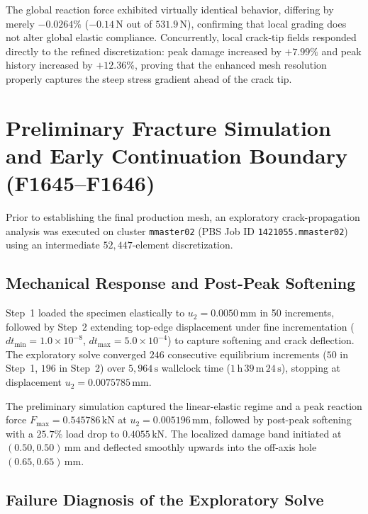 The global reaction force exhibited virtually identical behavior, differing by merely $-0.0264\%$ ($-0.14\,\mathrm{N}$ out of $531.9\,\mathrm{N}$), confirming that local grading does not alter global elastic compliance. Concurrently, local crack-tip fields responded directly to the refined discretization: peak damage increased by $+7.99\%$ and peak history increased by $+12.36\%$, proving that the enhanced mesh resolution properly captures the steep stress gradient ahead of the crack tip.

\section{Preliminary Fracture Simulation and Early Continuation Boundary (F1645--F1646)}
\label{sec:hole_preliminary_fracture}

Prior to establishing the final production mesh, an exploratory crack-propagation analysis was executed on cluster \texttt{mmaster02} (PBS Job ID \texttt{1421055.mmaster02}) using an intermediate $52{,}447$-element discretization. 

\subsection{Mechanical Response and Post-Peak Softening}
\label{subsec:hole_prelim_mechanical}

Step~1 loaded the specimen elastically to $u_2 = 0.0050\,\mathrm{mm}$ in 50 increments, followed by Step~2 extending top-edge displacement under fine incrementation ($dt_{\min} = 1.0 \times 10^{-8}$, $dt_{\max} = 5.0 \times 10^{-4}$) to capture softening and crack deflection. The exploratory solve converged $246$ consecutive equilibrium increments ($50$ in Step~1, $196$ in Step~2) over $5{,}964\,\mathrm{s}$ wallclock time ($1\,\mathrm{h}\,39\,\mathrm{m}\,24\,\mathrm{s}$), stopping at displacement $u_2 = 0.0075785\,\mathrm{mm}$.

The preliminary simulation captured the linear-elastic regime and a peak reaction force $F_{\max} = 0.545786\,\mathrm{kN}$ at $u_2 = 0.005196\,\mathrm{mm}$, followed by post-peak softening with a $25.7\%$ load drop to $0.4055\,\mathrm{kN}$. The localized damage band initiated at $(0.50, 0.50)\,\mathrm{mm}$ and deflected smoothly upwards into the off-axis hole $(0.65, 0.65)\,\mathrm{mm}$.

\subsection{Failure Diagnosis of the Exploratory Solve}
\label{subsec:hole_prelim_diagnosis}


